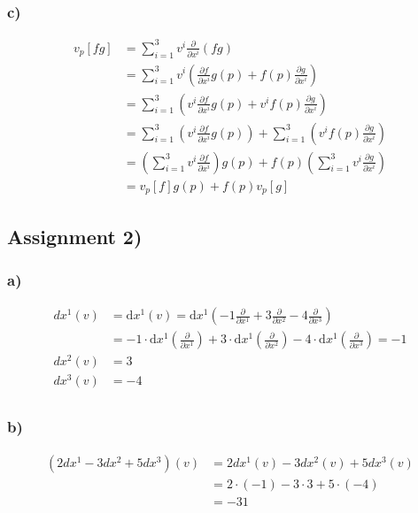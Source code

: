 \documentclass{article}
\begin{document}
\subsubsection*{c)}
\begin{align*}
	v_p[fg] &= \sum_{i=1}^3 v^i \frac{\partial}{\partial x^i} (fg)\\
	&= \sum_{i=1}^3 v^i \left( \frac{\partial f}{\partial x^i} g(p) + f(p) \frac{\partial g}{\partial x^i} \right)\\
	&= \sum_{i=1}^3 \left( v^i \frac{\partial f}{\partial x^i} g(p) + v^i f(p) \frac{\partial g}{\partial x^i} \right)\\
	&= \sum_{i=1}^3 \left( v^i \frac{\partial f}{\partial x^i} g(p) \right) + \sum_{i=1}^3 \left( v^i f(p) \frac{\partial g}{\partial x^i} \right)\\
	&= \left( \sum_{i=1}^3 v^i \frac{\partial f}{\partial x^i} \right) g(p) + f(p) \left( \sum_{i=1}^3 v^i \frac{\partial g}{\partial x^i} \right)\\
	&= v_p[f]g(p) + f(p)v_p[g]
\end{align*}

\subsection*{Assignment 2)}
\subsubsection*{a)}
\begin{align*}
	dx^1(v) &= \mathrm{d}x^1(v) = \mathrm{d}x^1 \left( -1\frac{\partial}{\partial x^1} + 3\frac{\partial}{\partial x^2} - 4\frac{\partial}{\partial x^3} \right)\\
	&= -1 \cdot \mathrm{d}x^1\left(\frac{\partial}{\partial x^1}\right) + 3 \cdot \mathrm{d}x^1\left(\frac{\partial}{\partial x^2}\right) - 4 \cdot \mathrm{d}x^1\left(\frac{\partial}{\partial x^3}\right) = -1\\
	dx^2(v) &= 3\\ 
	dx^3(v) &= -4\\ 
\end{align*}

\subsubsection*{b)}
\begin{align*}
	\left(2dx^1 - 3dx^2 + 5dx^3\right)(v) &= 2dx^1(v) - 3dx^2(v) + 5dx^3(v)\\
	&= 2 \cdot (-1) - 3 \cdot 3 + 5 \cdot (-4)\\
	&= -31
\end{align*}
\end{document}

